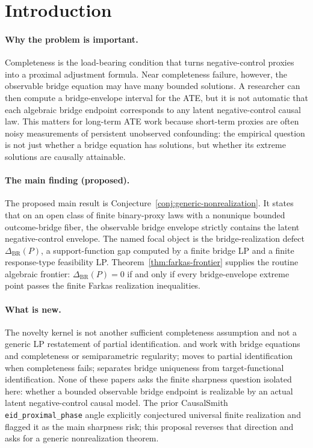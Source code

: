 \documentclass[11pt]{article}
\theoremstyle{definition}
\theoremstyle{plain}
\theoremstyle{remark}
\begin{document}
\section{Introduction}
\paragraph{Why the problem is important.}
Completeness is the load-bearing condition that turns negative-control proxies
into a proximal adjustment formula.  Near completeness failure, however, the
observable bridge equation may have many bounded solutions.  A researcher can
then compute a bridge-envelope interval for the ATE, but it is not automatic
that each algebraic bridge endpoint corresponds to any latent negative-control
causal law.  This matters for long-term ATE work because short-term proxies are
often noisy measurements of persistent unobserved confounding: the empirical
question is not just whether a bridge equation has solutions, but whether its
extreme solutions are causally attainable.

\paragraph{The main finding (proposed).}
The proposed main result is Conjecture~\ref{conj:generic-nonrealization}.  It
states that on an open class of finite binary-proxy laws with a nonunique
bounded outcome-bridge fiber, the observable bridge envelope strictly contains
the latent negative-control envelope.  The named focal object is the
bridge-realization defect \(\Delta_{\mathrm{BR}}(P)\), a support-function gap
computed by a finite bridge LP and a finite response-type feasibility LP.
Theorem~\ref{thm:farkas-frontier} supplies the routine algebraic frontier:
\(\Delta_{\mathrm{BR}}(P)=0\) if and only if every bridge-envelope extreme point
passes the finite Farkas realization inequalities.

\paragraph{What is new.}
The novelty kernel is not another sufficient completeness assumption and not a
generic LP restatement of partial identification.  \citet[Sections 2--3]{MiaoGengTchetgen2018}
and \citet[Section 3]{CuiPuShiMiaoTchetgen2024} work with bridge equations and
completeness or semiparametric regularity; \citet[abstract and Sections
3--4]{GhassamiShpitserTchetgen2023} moves to partial identification when
completeness fails; \citet[abstract and Sections 2--3]{ZhangLiMiaoTchetgen2023}
separates bridge uniqueness from target-functional identification.  None of
these papers asks the finite sharpness question isolated here: whether a
bounded observable bridge endpoint is realizable by an actual latent
negative-control causal model.  The prior CausalSmith
\texttt{eid\_proximal\_phase} angle explicitly conjectured universal finite
realization and flagged it as the main sharpness risk; this proposal reverses
that direction and asks for a generic nonrealization theorem.
\end{document}
